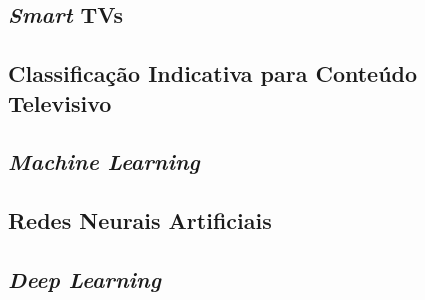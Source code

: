 
\subsection{\emph{Smart} TVs}


\subsection{Classificação Indicativa para Conteúdo Televisivo}


\subsection{\emph{Machine Learning}}


\subsection{Redes Neurais Artificiais}


\subsection{\emph{Deep Learning}}

